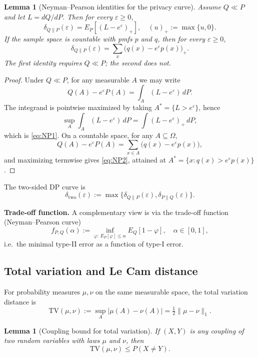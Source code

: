\documentclass{article}
\newtheorem{lemma}[theorem]{Lemma}
\begin{document}
\begin{lemma}[Neyman--Pearson identities for the privacy curve]
Assume $Q \ll P$ and let $L = dQ/dP$. Then for every $\varepsilon \geq 0$,
\begin{equation}
\delta_{Q\|P}(\varepsilon) = E_P[(L - e^\varepsilon)_+], \quad (u)_+ := \max\{u, 0\}. \label{eq:NP1}
\end{equation}
If the sample space is countable with pmfs $p$ and $q$, then for every $\varepsilon \geq 0$,
\begin{equation}
\delta_{Q\|P}(\varepsilon) = \sum_x \bigl(q(x) - e^\varepsilon p(x)\bigr)_+. \label{eq:NP2}
\end{equation}
The first identity requires $Q \ll P$; the second does not.
\end{lemma}

\begin{proof}
Under $Q \ll P$, for any measurable $A$ we may write
\[
Q(A) - e^\varepsilon P(A) = \int_A (L - e^\varepsilon)\, dP.
\]
The integrand is pointwise maximized by taking $A^* = \{L > e^\varepsilon\}$, hence
\[
\sup_A \int_A (L - e^\varepsilon)\, dP = \int (L - e^\varepsilon)_+\, dP,
\]
which is \eqref{eq:NP1}. On a countable space, for any $A \subseteq \Omega$,
\[
Q(A) - e^\varepsilon P(A) = \sum_{x \in A} \bigl(q(x) - e^\varepsilon p(x)\bigr),
\]
and maximizing termwise gives \eqref{eq:NP2}, attained at $A^* = \{x: q(x) > e^\varepsilon p(x)\}$.
\end{proof}

The two-sided DP curve is
\[
\delta_{\mathrm{two}}(\varepsilon) := \max\{\delta_{Q\|P}(\varepsilon), \delta_{P\|Q}(\varepsilon)\}.
\]

\textbf{Trade-off function.} A complementary view is via the trade-off function (Neyman--Pearson curve)
\[
f_{P,Q}(\alpha) := \inf_{\varphi:\, E_P[\varphi] \leq \alpha} E_Q[1 - \varphi], \quad \alpha \in [0,1],
\]
i.e.\ the minimal type-II error as a function of type-I error.

\subsection{Total variation and Le Cam distance}

For probability measures $\mu, \nu$ on the same measurable space, the total variation distance is
\[
\mathrm{TV}(\mu, \nu) := \sup_A |\mu(A) - \nu(A)| = \tfrac{1}{2}\|\mu - \nu\|_1.
\]

\begin{lemma}[Coupling bound for total variation]
If $(X, Y)$ is any coupling of two random variables with laws $\mu$ and $\nu$, then
\[
\mathrm{TV}(\mu, \nu) \leq P(X \neq Y).
\]
\end{lemma}
\end{document}
